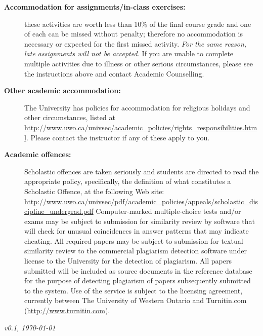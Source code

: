 \documentclass[12pt]{article}
\begin{document}
\begin{description}
\item[\bf Accommodation for assignments/in-class exercises:] these activities are worth less than 10\% of the
final course grade and one of each can be missed without penalty; therefore no accommodation is necessary or expected
for the first missed activity. {\em For the same reason, late assignments will not be accepted.} If you are unable
to complete multiple activities due to illness or other serious circumstances, please see the instructions above 
and contact Academic Counselling.

\item[\bf Other academic accommodation:] The University has policies for accommodation for religious holidays and other circumstances,
listed at \url{http://www.uwo.ca/univsec/academic_policies/rights_responsibilities.html}. Please contact the instructor if any of these apply to you.

\item[\bf Academic offences:] Scholastic offences are taken seriously and students are directed to read the
appropriate policy, specifically, the definition of what constitutes a Scholastic Offence, at the
following Web site:
\url{http://www.uwo.ca/univsec/pdf/academic_policies/appeals/scholastic_discipline_undergrad.pdf}
Computer-marked multiple-choice tests and/or exams may be subject to submission for similarity review by software that will check for unusual coincidences in answer patterns that may indicate cheating.
All required papers may be subject to submission for textual similarity review to the commercial plagiarism detection software under license to the University for the detection of plagiarism. All papers submitted will be included as source documents in the reference database for the purpose of detecting plagiarism of papers subsequently submitted to the system. Use of the service is subject to the licensing agreement, currently between The University of Western Ontario and Turnitin.com (\url{http://www.turnitin.com}).
\end{description}

{\em v0.1, \today}
\end{document}
